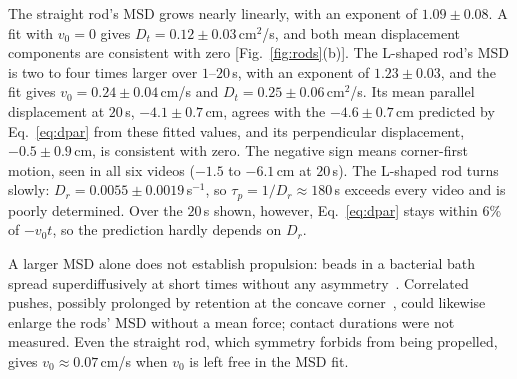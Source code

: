 \documentclass[10pt,twocolumn]{article}
\begin{document}
The straight rod's MSD grows nearly linearly, with an exponent of $1.09\pm0.08$.
A fit with $v_0=0$ gives $D_t=0.12\pm0.03\,$cm$^2$/s, and both mean displacement components are consistent with zero [Fig.~\ref{fig:rods}(b)].
The L-shaped rod's MSD is two to four times larger over $1$--$20\,$s, with an exponent of $1.23\pm0.03$, and the fit gives $v_0=0.24\pm0.04\,$cm/s and $D_t=0.25\pm0.06\,$cm$^2$/s.
Its mean parallel displacement at $20\,$s, $-4.1\pm0.7\,$cm, agrees with the $-4.6\pm0.7\,$cm predicted by Eq.~\eqref{eq:dpar} from these fitted values, and its perpendicular displacement, $-0.5\pm0.9\,$cm, is consistent with zero.
The negative sign means corner-first motion, seen in all six videos ($-1.5$ to $-6.1\,$cm at $20\,$s).
The L-shaped rod turns slowly: $D_r=0.0055\pm0.0019\,$s$^{-1}$, so $\tau_p=1/D_r\approx180\,$s exceeds every video and is poorly determined.
Over the $20\,$s shown, however, Eq.~\eqref{eq:dpar} stays within $6\%$ of $-v_0t$, so the prediction hardly depends on $D_r$.

A larger MSD alone does not establish propulsion: beads in a bacterial bath spread superdiffusively at short times without any asymmetry~\cite{WuLibchaber2000,Bechinger2016}.
Correlated pushes, possibly prolonged by retention at the concave corner~\cite{Balda2022}, could likewise enlarge the rods' MSD without a mean force; contact durations were not measured.
Even the straight rod, which symmetry forbids from being propelled, gives $v_0\approx0.07\,$cm/s when $v_0$ is left free in the MSD fit.
\end{document}
